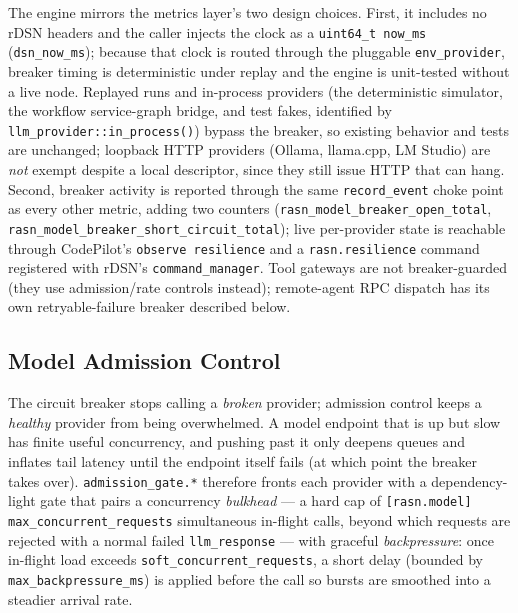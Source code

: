 \documentclass[manuscript,screen,review]{acmart}
\newcommand{\rdsn}{rDSN\xspace}
\newcommand{\codepilot}{CodePilot\xspace}
\begin{document}
The engine mirrors the metrics layer's two design choices. First, it includes no
\rdsn headers and the caller injects the clock as a \texttt{uint64\_t now\_ms}
(\texttt{dsn\_now\_ms}); because that clock is routed through the pluggable
\texttt{env\_provider}, breaker timing is deterministic under replay and the
engine is unit-tested without a live node. Replayed runs and in-process
providers (the deterministic simulator, the workflow service-graph bridge, and
test fakes, identified by \texttt{llm\_provider::in\_process()}) bypass the
breaker, so existing behavior and tests are unchanged; loopback HTTP providers
(Ollama, llama.cpp, LM Studio) are \emph{not} exempt despite a local descriptor,
since they still issue HTTP that can hang. Second, breaker activity is reported
through the same
\texttt{record\_event} choke point as every other metric, adding two counters
(\texttt{rasn\_model\_breaker\_open\_total},
\texttt{rasn\_model\_breaker\_short\_circuit\_total}); live per-provider state is
reachable through \codepilot's \texttt{observe resilience} and a
\texttt{rasn.resilience} command registered with \rdsn's
\texttt{command\_manager}. Tool gateways are not breaker-guarded (they use
admission/rate controls instead); remote-agent RPC dispatch has its own
retryable-failure breaker described below.

\subsection{Model Admission Control}

The circuit breaker stops calling a \emph{broken} provider; admission control keeps
a \emph{healthy} provider from being overwhelmed. A model endpoint that is up but
slow has finite useful concurrency, and pushing past it only deepens queues and
inflates tail latency until the endpoint itself fails (at which point the breaker
takes over). \texttt{admission\_gate.*} therefore fronts each provider with a
dependency-light gate that pairs a concurrency \emph{bulkhead} --- a hard cap of
\texttt{[rasn.model] max\_concurrent\_requests} simultaneous in-flight calls, beyond
which requests are rejected with a normal failed \texttt{llm\_response} --- with
graceful \emph{backpressure}: once in-flight load exceeds
\texttt{soft\_concurrent\_requests}, a short delay (bounded by
\texttt{max\_backpressure\_ms}) is applied before the call so bursts are smoothed
into a steadier arrival rate.
\end{document}

